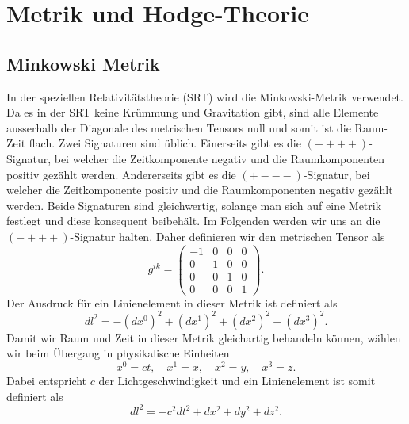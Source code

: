 %
%
%
%
\section{Metrik und Hodge-Theorie 
\label{maxwell:section:teil1}}

\subsection{Minkowski Metrik}
In der speziellen Relativitätstheorie (SRT) wird die Minkowski-Metrik verwendet.
Da es in der SRT keine Krümmung und Gravitation gibt, sind alle Elemente ausserhalb der Diagonale des metrischen Tensors null und somit ist die Raum-Zeit flach.
Zwei Signaturen sind üblich.
Einerseits gibt es die $({-}{+}{+}{+})$-Signatur, bei welcher die Zeitkomponente negativ und die Raumkomponenten positiv gezählt werden.
Andererseits gibt es die $({+}{-}{-}{-})$-Signatur, bei welcher die Zeitkomponente positiv und die Raumkomponenten negativ gezählt werden.
Beide Signaturen sind gleichwertig, solange man sich auf eine Metrik festlegt und diese konsequent beibehält.
Im Folgenden werden wir uns an die $({-}{+}{+}{+})$-Signatur halten.
Daher definieren wir den metrischen Tensor als
\begin{equation}
	g^{ik} = \begin{pmatrix}
		-1 & 0 & 0 & 0 \\ 0 & 1 & 0 & 0 \\ 0 & 0 & 1 & 0 \\ 0 & 0 & 0 & 1 
	\end{pmatrix}.
	\label{maxwell:section:teil1:metrik}
\end{equation}
Der Ausdruck für ein Linienelement in dieser Metrik ist definiert als
\begin{equation*}
	dl^2 = -(dx^0)^2 +(dx^1)^2+(dx^2)^2+(dx^3)^2.
\end{equation*}
Damit wir Raum und Zeit in dieser Metrik gleichartig behandeln können, wählen wir beim Übergang in physikalische Einheiten 
\begin{equation}
	\label{maxwell:koordinaten}
	x^0 = ct,\quad x^1 = x,\quad x^2 = y, \quad x^3 = z .
\end{equation}
Dabei entspricht $c$ der Lichtgeschwindigkeit und ein Linienelement ist somit definiert als
\begin{equation*}
	dl^2 = -c^2dt^2 +dx^2+dy^2+dz^2.
\end{equation*}
